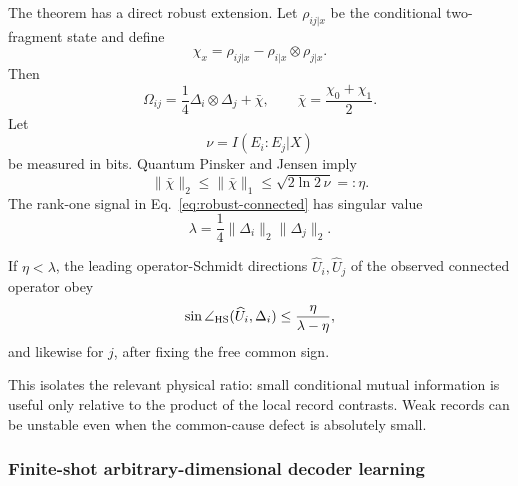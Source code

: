 The theorem has a direct robust extension.  Let $\rho_{ij|x}$ be the conditional two-fragment state and define
\begin{equation}
\chi_x=\rho_{ij|x}-\rho_{i|x}\otimes\rho_{j|x}.
\end{equation}
Then
\begin{equation}
\Omega_{ij}=\frac14\Delta_i\otimes\Delta_j+\bar\chi,
\qquad
\bar\chi=\frac{\chi_0+\chi_1}{2}.
\label{eq:robust-connected}
\end{equation}
Let
\begin{equation}
\nu=I(E_i:E_j|X)
\end{equation}
be measured in bits.  Quantum Pinsker and Jensen imply
\begin{equation}
\|\bar\chi\|_2\le\|\bar\chi\|_1
\le\sqrt{2\ln2\,\nu}=: \eta.
\label{eq:cmi-noise}
\end{equation}
The rank-one signal in Eq.~\eqref{eq:robust-connected} has singular value
\begin{equation}
\lambda=\frac14\|\Delta_i\|_2\|\Delta_j\|_2.
\end{equation}

\begin{corollary}
\label{cor:robust-binary}
If $\eta<\lambda$, the leading operator-Schmidt directions $\widehat U_i,\widehat U_j$ of the observed connected operator obey
\begin{equation}
\sin\angle_{\rm HS}(\widehat U_i,\Delta_i)
\le\frac{\eta}{\lambda-\eta},
\label{eq:binary-angle}
\end{equation}
and likewise for $j$, after fixing the free common sign.
\end{corollary}

This isolates the relevant physical ratio: small conditional mutual information is useful only relative to the product of the local record contrasts.  Weak records can be unstable even when the common-cause defect is absolutely small.

\subsubsection{Finite-shot arbitrary-dimensional decoder learning}

